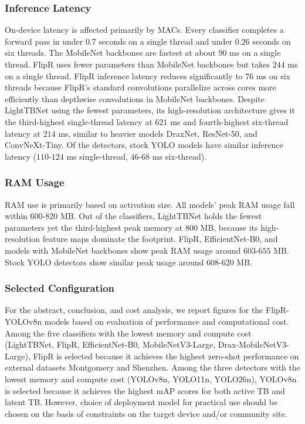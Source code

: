\documentclass[conference, letterpaper]{IEEEtran}
\begin{document}
\subsubsection{Inference Latency}

On-device latency is affected primarily by MACs. Every classifier completes a forward pass in under $0.7$ seconds on a single thread and under $0.26$ seconds on six threads.  The MobileNet backbones are fastest at about $90$ ms on a single thread. FlipR uses fewer parameters than MobileNet backbones but takes $244$ ms on a single thread. FlipR inference latency reduces significantly to $76$ ms on six threads because FlipR's standard convolutions parallelize across cores more efficiently than depthwise convolutions in MobileNet backbones. Despite LightTBNet using the fewest parameters, its high-resolution architecture gives it the third-highest single-thread latency at $621$ ms and fourth-highest six-thread latency at $214$ ms, similar to heavier models DraxNet, ResNet-50, and ConvNeXt-Tiny. Of the detectors, stock YOLO models have similar inference latency ($110\text{-}124$ ms single-thread, $46\text{-}68$ ms six-thread).

\subsubsection{RAM Usage}

RAM use is primarily based on activation size. All models' peak RAM usage fall within $600\text{-}820$ MB. Out of the classifiers, LightTBNet holds the fewest parameters yet the third-highest peak memory at $800$ MB, because its high-resolution feature maps dominate the footprint. FlipR, EfficientNet-B0, and models with MobileNet backbones show peak RAM usage around $603\text{-}655$ MB. Stock YOLO detectors show similar peak usage around $608\text{-}620$ MB.

\subsubsection{Selected Configuration}

For the abstract, conclusion, and cost analysis, we report figures for the FlipR-YOLOv8n models based on evaluation of performance and computational cost. Among the five classifiers with the lowest memory and compute cost (LightTBNet, FlipR, EfficientNet-B0, MobileNetV3-Large, Drax-MobileNetV3-Large), FlipR is selected because it achieves the highest zero-shot performance on external datasets Montgomery and Shenzhen. Among the three detectors with the lowest memory and compute cost (YOLOv8n, YOLO11n, YOLO26n), YOLOv8n is selected because it achieves the highest $\mathrm{mAP}$ scores for both active TB and latent TB. However, choice of deployment model for practical use should be chosen on the basis of constraints on the target device and/or community site.
\end{document}
